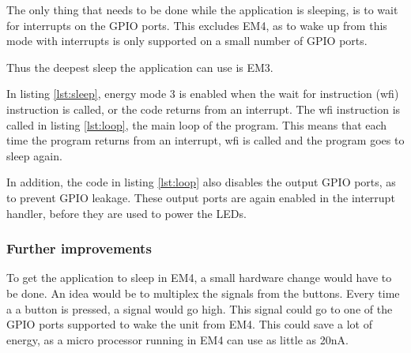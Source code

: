 The only thing that needs to be done while the application is sleeping, is to wait for interrupts on the GPIO ports.
This excludes EM4, as to wake up from this mode with interrupts is only supported on a small number of GPIO ports.

Thus the deepest sleep the application can use is EM3.



In listing \ref{lst:sleep}, energy mode 3 is enabled when the wait for instruction (wfi) instruction is called, or the code returns from an interrupt.
The wfi instruction is called in listing \ref{lst:loop}, the main loop of the program. 
This means that each time the program returns from an interrupt, wfi is called and the program goes to sleep again.



In addition, the code in listing \ref{lst:loop} also disables the output GPIO ports, as to prevent GPIO leakage.\cite{energy} 
These output ports are again enabled in the interrupt handler, before they are used to power the LEDs.

\subsubsection{Further improvements}

To get the application to sleep in EM4, a small hardware change would have to be done.
An idea would be to multiplex the signals from the buttons.
Every time a a button is pressed, a signal would go high.
This signal could go to one of the GPIO ports supported to wake the unit from EM4.
This could save a lot of energy, as a micro processor running in EM4 can use as little as 20nA.\cite{modes}
